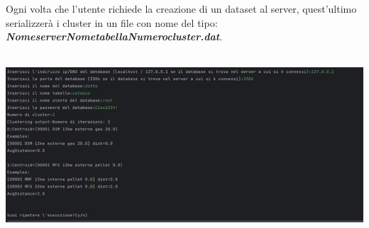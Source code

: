 \begin{enumerate}
\begin{itemize}[label=-]
    Ogni volta che l'utente richiede la creazione di un dataset al server, quest'ultimo serializzerà i cluster in un file con nome del tipo: \textbf{\textit{NomeserverNometabellaNumerocluster.dat}}. \\ \\
    \begin{minipage}[t]{0.3\textwidth}
      \includegraphics[scale=0.8]{img/test14.png}
    \end{minipage}
  \end{itemize}
\end{enumerate}